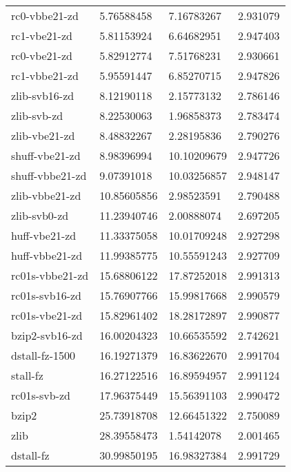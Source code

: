 \begin{table}
\begin{tabular}{|l|l|l|l|}
		\rowcolor{lightgray}
      rc0-vbbe21-zd     & 5.76588458      & 7.16783267    &2.931079\\
		\rowcolor{lightgray}
       rc1-vbe21-zd     & 5.81153924      & 6.64682951    &2.947403\\
		\rowcolor{lightgray}
       rc0-vbe21-zd     & 5.82912774      & 7.51768231    &2.930661\\
		\rowcolor{lightgray}
      rc1-vbbe21-zd     & 5.95591447      & 6.85270715    &2.947826\\
      zlib-svb16-zd     & 8.12190118      & 2.15773132    &2.786146\\
        zlib-svb-zd     & 8.22530063      & 1.96858373    &2.783474\\
      zlib-vbe21-zd     & 8.48832267      & 2.28195836    &2.790276\\
		\rowcolor{lightgray}
     shuff-vbe21-zd     & 8.98396994      &10.10209679    &2.947726\\
		\rowcolor{lightgray}
    shuff-vbbe21-zd     & 9.07391018      &10.03256857    &2.948147\\
     zlib-vbbe21-zd     &10.85605856      & 2.98523591    &2.790488\\
       zlib-svb0-zd     &11.23940746      & 2.00888074    &2.697205\\
      huff-vbe21-zd     &11.33375058      &10.01709248    &2.927298\\
     huff-vbbe21-zd     &11.99385775      &10.55591243    &2.927709\\
		\rowcolor{lightgray}
    rc01s-vbbe21-zd     &15.68806122      &17.87252018    &2.991313\\
		\rowcolor{lightgray}
     rc01s-svb16-zd     &15.76907766      &15.99817668    &2.990579\\
		\rowcolor{lightgray}
     rc01s-vbe21-zd     &15.82961402      &18.28172897    &2.990877\\
     bzip2-svb16-zd     &16.00204323      &10.66535592    &2.742621\\
		\rowcolor{lightgray}
     dstall-fz-1500     &16.19271379      &16.83622670    &2.991704\\
		\rowcolor{lightgray}
           stall-fz     &16.27122516      &16.89594957    &2.991124\\
		\rowcolor{lightgray}
       rc01s-svb-zd     &17.96375449      &15.56391103    &2.990472\\
              bzip2     &25.73918708      &12.66451322    &2.750089\\
               zlib     &28.39558473      & 1.54142078    &2.001465\\
		\rowcolor{lightgray}
          dstall-fz     &30.99850195      &16.98327384    &2.991729\\
	\hline
    \end{tabular}
\end{table}
